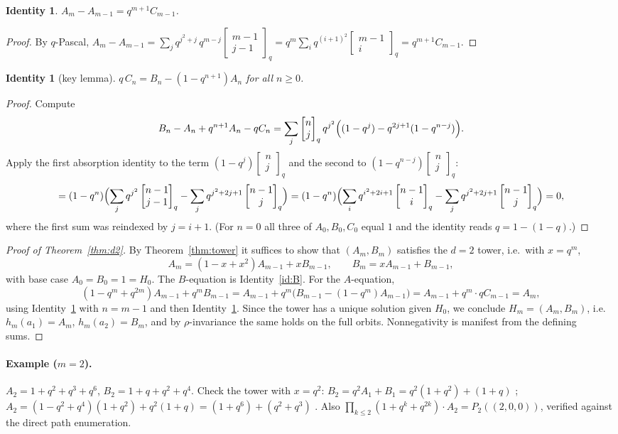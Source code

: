 \documentclass[11pt]{article}
\newtheorem{identity}[theorem]{Identity}
\theoremstyle{remark}
\newcommand{\qbin}[2]{\begin{bmatrix}#1\\#2\end{bmatrix}_q}
\begin{document}
\begin{identity}\label{id:A}
$A_m-A_{m-1}=q^{m+1} C_{m-1}$.
\end{identity}
\begin{proof}
By $q$-Pascal, $A_m-A_{m-1}=\sum_j q^{j^2+j}\,q^{m-j}\qbin{m-1}{j-1}
= q^m\sum_i q^{(i+1)^2}\qbin{m-1}{i}=q^{m+1}C_{m-1}$.
\end{proof}

\begin{identity}[key lemma]\label{id:C}
$q\,C_n = B_n-(1-q^{n+1})A_n$ for all $n\ge 0$.
\end{identity}
\begin{proof}
Compute
\[
B_n-A_n+q^{n+1}A_n-qC_n
=\sum_j \qbin{n}{j}q^{j^2}\Bigl((1-q^j)-q^{2j+1}(1-q^{n-j})\Bigr).
\]
Apply the first absorption identity to the term $(1-q^j)\qbin{n}{j}$ and
the second to $(1-q^{n-j})\qbin{n}{j}$:
\[
=(1-q^n)\Bigl(\sum_j q^{j^2}\qbin{n-1}{j-1}
-\sum_j q^{j^2+2j+1}\qbin{n-1}{j}\Bigr)
=(1-q^n)\Bigl(\sum_i q^{i^2+2i+1}\qbin{n-1}{i}
-\sum_j q^{j^2+2j+1}\qbin{n-1}{j}\Bigr)=0,
\]
where the first sum was reindexed by $j=i+1$.
(For $n=0$ all three of $A_0,B_0,C_0$ equal $1$ and the identity reads
$q=1-(1-q)$.)
\end{proof}

\begin{proof}[Proof of Theorem~\ref{thm:d2}]
By Theorem~\ref{thm:tower} it suffices to show that
$(A_m,B_m)$ satisfies the $d=2$ tower, i.e.\ with $x=q^m$,
\[
A_m=(1-x+x^2)A_{m-1}+xB_{m-1},\qquad
B_m=xA_{m-1}+B_{m-1},
\]
with base case $A_0=B_0=1=H_0$. The $B$-equation is
Identity~\ref{id:B}. For the $A$-equation,
\[
(1-q^m+q^{2m})A_{m-1}+q^mB_{m-1}
=A_{m-1}+q^m\bigl(B_{m-1}-(1-q^m)A_{m-1}\bigr)
=A_{m-1}+q^m\cdot qC_{m-1}=A_m,
\]
using Identity~\ref{id:C} with $n=m-1$ and then Identity~\ref{id:A}.
Since the tower has a unique solution given $H_0$, we conclude
$H_m=(A_m,B_m)$, i.e.\ $h_m(a_1)=A_m$, $h_m(a_2)=B_m$, and by
$\rho$-invariance the same holds on the full orbits. Nonnegativity is
manifest from the defining sums.
\end{proof}

\paragraph{Example ($m=2$).}
$A_2=1+q^2+q^3+q^6$, $B_2=1+q+q^2+q^4$. Check the tower with $x=q^2$:
$B_2=q^2A_1+B_1=q^2(1+q^2)+(1+q)$ \checkmark;
$A_2=(1-q^2+q^4)(1+q^2)+q^2(1+q)=(1+q^6)+(q^2+q^3)$ \checkmark.
Also $\prod_{k\le 2}(1+q^k+q^{2k})\cdot A_2 = P_2((2,0,0))$, verified
against the direct path enumeration.
\end{document}
